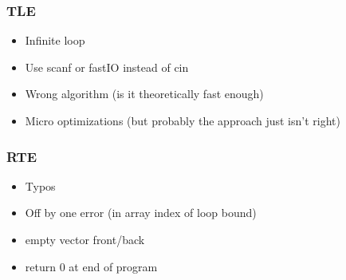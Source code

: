 \documentclass[
	a4paper,
	landscape,
	10pt,
	article
]{article}
\begin{document}
\subsubsection*{TLE}
\begin{itemize}
	\setlength\itemsep{0em}
	\item Infinite loop
	\item Use scanf or fastIO instead of cin
	\item Wrong algorithm (is it theoretically fast enough)
	\item Micro optimizations (but probably the approach just isn't right)
\end{itemize}

\subsubsection*{RTE}
\begin{itemize}
	\setlength\itemsep{0em}
	\item Typos
	\item Off by one error (in array index of loop bound)
	\item empty vector front/back
	\item return 0 at end of program
\end{itemize}
\end{document}
